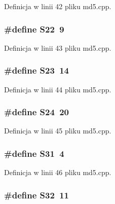 Definicja w linii 42 pliku md5.cpp.\hypertarget{a00009_ddad30455da936bc1879ee9c72b46d59}{
\subsubsection[{S22}]{\setlength{\rightskip}{0pt plus 5cm}\#define S22~9}}
\label{da/da0/a00009_ddad30455da936bc1879ee9c72b46d59}




Definicja w linii 43 pliku md5.cpp.\hypertarget{a00009_6321a8b29628936f76e9e78cf5bda95f}{
\subsubsection[{S23}]{\setlength{\rightskip}{0pt plus 5cm}\#define S23~14}}
\label{da/da0/a00009_6321a8b29628936f76e9e78cf5bda95f}




Definicja w linii 44 pliku md5.cpp.\hypertarget{a00009_0c09eb77d30a0d5f9154914147b86c20}{
\subsubsection[{S24}]{\setlength{\rightskip}{0pt plus 5cm}\#define S24~20}}
\label{da/da0/a00009_0c09eb77d30a0d5f9154914147b86c20}




Definicja w linii 45 pliku md5.cpp.\hypertarget{a00009_ef26590f8a880ee6f4a158168defcd89}{
\subsubsection[{S31}]{\setlength{\rightskip}{0pt plus 5cm}\#define S31~4}}
\label{da/da0/a00009_ef26590f8a880ee6f4a158168defcd89}




Definicja w linii 46 pliku md5.cpp.\hypertarget{a00009_1d512424dd8a91e0a5bcc98563f33914}{
\subsubsection[{S32}]{\setlength{\rightskip}{0pt plus 5cm}\#define S32~11}}
\label{da/da0/a00009_1d512424dd8a91e0a5bcc98563f33914}




